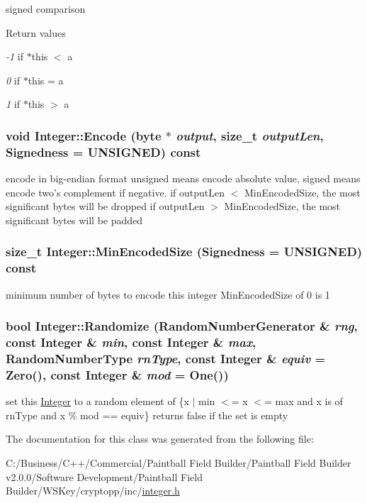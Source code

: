 signed comparison 
\begin{DoxyRetVals}{Return values}
\item[{\em -\/1}]if $\ast$this $<$ a \item[{\em 0}]if $\ast$this = a \item[{\em 1}]if $\ast$this $>$ a \end{DoxyRetVals}
\hypertarget{class_integer_ac12ea467de9a609b86ec03d8cb8837e4}{
\subsubsection[{Encode}]{\setlength{\rightskip}{0pt plus 5cm}void Integer::Encode (byte $\ast$ {\em output}, \/  size\_\-t {\em outputLen}, \/  Signedness = {\ttfamily UNSIGNED}) const}}
\label{class_integer_ac12ea467de9a609b86ec03d8cb8837e4}


encode in big-\/endian format unsigned means encode absolute value, signed means encode two's complement if negative. if outputLen $<$ MinEncodedSize, the most significant bytes will be dropped if outputLen $>$ MinEncodedSize, the most significant bytes will be padded \hypertarget{class_integer_a3b269bbf8a91faf217c0dd76222182bb}{
\subsubsection[{MinEncodedSize}]{\setlength{\rightskip}{0pt plus 5cm}size\_\-t Integer::MinEncodedSize (Signedness = {\ttfamily UNSIGNED}) const}}
\label{class_integer_a3b269bbf8a91faf217c0dd76222182bb}


minimum number of bytes to encode this integer MinEncodedSize of 0 is 1 \hypertarget{class_integer_a83dd6a11aa51d545ce2735777787b622}{
\subsubsection[{Randomize}]{\setlength{\rightskip}{0pt plus 5cm}bool Integer::Randomize ({\bf RandomNumberGenerator} \& {\em rng}, \/  const {\bf Integer} \& {\em min}, \/  const {\bf Integer} \& {\em max}, \/  RandomNumberType {\em rnType}, \/  const {\bf Integer} \& {\em equiv} = {\ttfamily Zero()}, \/  const {\bf Integer} \& {\em mod} = {\ttfamily One()})}}
\label{class_integer_a83dd6a11aa51d545ce2735777787b622}


set this \hyperlink{class_integer}{Integer} to a random element of \{x $|$ min $<$= x $<$= max and x is of rnType and x \% mod == equiv\} returns false if the set is empty 

The documentation for this class was generated from the following file:\begin{DoxyCompactItemize}
\item 
C:/Business/C++/Commercial/Paintball Field Builder/Paintball Field Builder v2.0.0/Software Development/Paintball Field Builder/WSKey/cryptopp/inc/\hyperlink{integer_8h}{integer.h}\end{DoxyCompactItemize}
